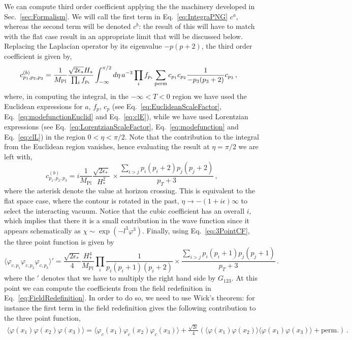 \documentclass[a4paper,11pt]{article}
\numberwithin{equation}{section}
\newcommand{\be}{\begin{equation}}
\newcommand{\ee}{\end{equation}}
\newcommand{\mpl}{{M_{\mathrm{Pl}}}}
\numberwithin{equation}{section}
\begin{document}
We can compute third order coefficient applying the  the machinery developed in Sec.~\ref{sec:Formalism}. We will call the first term in  Eq.~\eqref{eq:IntegraPNG} $c^{a}$, whereas the second term will be denoted $c^{b}$: the result of this will have to match with the flat case result in an appropriate limit that will be discussed below. Replacing the Laplacian operator by its eigenvalue $-p(p+2)$, the third order coefficient is given by,
\begin{align}
c^{(b)}_{p_1,p_2,p_3}&=\frac{1}{\mpl}\frac{\sqrt{2\epsilon_*} H_*}{\prod_{i}f_{p_i}}\int_{-\infty}^{\pi/2} d\eta \, a^{-3}\prod_{i}f_{p_i}\sum_{\rm{perm}}c_{p_1}c_{p_2}\frac{1}{-p_3(p_3+2)}c_{p_3}\,,\nonumber
\end{align}
where, in computing the integral, in the $-\infty < T < 0$ region we have used the Euclidean expressions for $a$, $f_p$, $c_p$ (see Eq.~\eqref{eq:EuclideanScaleFactor}, Eq.~\eqref{eq:modefunctionEuclid} and Eq.~\eqref{eq:clE}), while we have used Lorentzian expressions (see Eq.~\eqref{eq:LorentzianScaleFactor}, Eq.~\eqref{eq:modefunction} and Eq.~\eqref{eq:clL}) in the region $0 < \eta < \pi/2$. Note that the contribution to the integral from the Euclidean region vanishes, hence evaluating the result at $\eta = \pi/2$ we are left with,
\begin{equation}
c^{(b)}_{p_1,p_2,p_3} = i\frac{1}{\mpl}\frac{\sqrt{2\epsilon_*}}{H_*^2} \,  \times \frac{\sum_{i>j}p_i(p_i+2)p_j(p_j+2)}{p_T+3} \,,
\end{equation}
where the asterisk denote the value at horizon crossing. This is equivalent to the flat space case, where the contour is rotated in the past, $\eta\to-(1+i\epsilon)\infty$ to select the interacting vacuum. Notice that the cubic coefficient has an overall $i$, which implies that there it is a small contribution in the wave function since it appears schematically as $\chi\sim\exp(- l^3 \varphi^3)$. Finally, using Eq.~\eqref{eq:3PointCF}, the three point function is given by 
\be
\boxed{\langle\varphi_{c, p_1}\varphi_{c, p_2}\varphi_{c, p_3}\rangle'=\frac{\sqrt{2\epsilon_*}}{4}\frac{H_*^4}{\mpl}\prod_{i}\frac{1}{p_i(p_i+1)(p_i+2)}\times\frac{\sum_{i>j}p_i(p_i+1)p_j(p_j+1)}{p_T+3}} \,.
\ee
where the $'$ denotes that we have to multiply the right hand side by $G_{123}$.
At this point we can compute the coefficients from the field redefinition in Eq.~\eqref{eq:FieldRedefinition}. In order to do so, we need to use Wick's theorem: for instance the first term in the field redefinition gives the following contribution to the three point function,
\begin{align}
\langle \varphi(x_1)\varphi(x_2)\varphi(x_3)\rangle=\langle \varphi_c(x_1)\varphi_c(x_2)\varphi_c(x_3)\rangle+\frac{\sqrt{2\epsilon}}{4}\left(\langle\varphi(x_1)\varphi(x_2)\rangle\langle\varphi(x_1)\varphi(x_3)\rangle+\mathrm{perm.}\right) \,.
\end{align}
\end{document}
